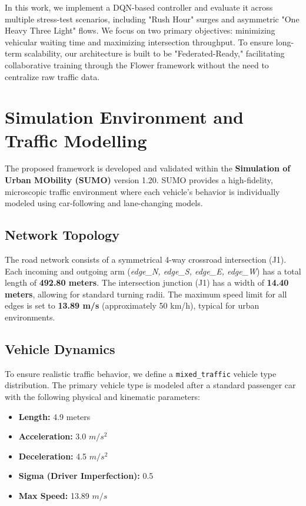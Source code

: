 \documentclass[conference]{IEEEtran}
\begin{document}
In this work, we implement a DQN-based controller and evaluate it across multiple stress-test scenarios, including "Rush Hour" surges and asymmetric "One Heavy Three Light" flows. We focus on two primary objectives: minimizing vehicular waiting time and maximizing intersection throughput. To ensure long-term scalability, our architecture is built to be "Federated-Ready," facilitating collaborative training through the Flower framework without the need to centralize raw traffic data.

\section{Simulation Environment and Traffic Modelling}
The proposed framework is developed and validated within the \textbf{Simulation of Urban MObility (SUMO)} version 1.20. SUMO provides a high-fidelity, microscopic traffic environment where each vehicle's behavior is individually modeled using car-following and lane-changing models.

\subsection{Network Topology}
The road network consists of a symmetrical 4-way crossroad intersection (J1). Each incoming and outgoing arm (\textit{edge\_N, edge\_S, edge\_E, edge\_W}) has a total length of \textbf{492.80 meters}. The intersection junction (J1) has a width of \textbf{14.40 meters}, allowing for standard turning radii. The maximum speed limit for all edges is set to \textbf{13.89 m/s} (approximately 50 km/h), typical for urban environments.

\subsection{Vehicle Dynamics}
To ensure realistic traffic behavior, we define a \texttt{mixed\_traffic} vehicle type distribution. The primary vehicle type is modeled after a standard passenger car with the following physical and kinematic parameters:
\begin{itemize}
    \item \textbf{Length:} 4.9 meters
    \item \textbf{Acceleration:} 3.0 $m/s^2$
    \item \textbf{Deceleration:} 4.5 $m/s^2$
    \item \textbf{Sigma (Driver Imperfection):} 0.5
    \item \textbf{Max Speed:} 13.89 $m/s$
\end{itemize}
\end{document}
